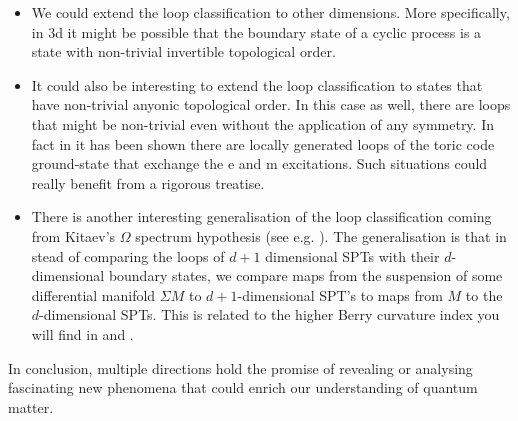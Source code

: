 \begin{itemize}
	\item We could extend the loop classification to other dimensions. More specifically, in 3d it might be possible that the boundary state of a cyclic process is a state with non-trivial invertible topological order.
	\item It could also be interesting to extend the loop classification to states that have non-trivial anyonic topological order. In this case as well, there are loops that might be non-trivial even without the application of any symmetry. In fact in \cite{Aasen_2022} it has been shown there are locally generated loops of the toric code ground-state that exchange the e and m excitations. Such situations could really benefit from a rigorous treatise.
	\item There is another interesting generalisation of the loop classification coming from Kitaev's $\Omega$ spectrum hypothesis (see e.g. \cite{Xiong_2018}). The generalisation is that in stead of comparing the loops of $d+1$ dimensional SPTs with their $d$-dimensional boundary states, we compare maps from the suspension of some differential manifold $\Sigma M$ to $d+1$-dimensional SPT's to maps from $M$ to the $d$-dimensional SPTs. This is related to the higher Berry curvature index you will find in \cite{Kapustin_2022} and \cite{artymowicz2023quantization}.
\end{itemize}
In conclusion, multiple directions hold the promise of revealing or analysing fascinating new phenomena that could enrich our understanding of quantum matter.
\cleardoublepage

